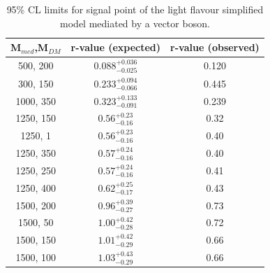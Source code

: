 \begin{table}[h!]
    \caption{%
    95\% CL limits for signal point of the light flavour simplified model 
    mediated by a vector boson. }
    \label{tab:DMV_limits}
    \centering
    \begin{tabular}{ ccc }
        \hline\hline
        M$_{med}$,M$_{DM}$ & r-value (expected) & r-value (observed) \\ 
        \hline
        500, 200  & $0.088_{-0.025}^{+0.036}$ & 0.120 \\
        300, 150  & $0.233_{-0.066}^{+0.094}$ & 0.445 \\
        1000, 350 & $0.323_{-0.091}^{+0.133}$ & 0.239 \\
        1250, 150 & $0.56_{-0.16}^{+0.23}$    & 0.32  \\
        1250, 1   & $0.56_{-0.16}^{+0.23}$    & 0.40  \\
        1250, 350 & $0.57_{-0.16}^{+0.24}$    & 0.40  \\
        1250, 250 & $0.57_{-0.16}^{+0.24}$    & 0.41  \\
        1250, 400 & $0.62_{-0.17}^{+0.25}$    & 0.43  \\
        1500, 200 & $0.96_{-0.27}^{+0.39}$    & 0.73  \\
        1500, 50  & $1.00_{-0.28}^{+0.42}$    & 0.72  \\
        1500, 150 & $1.01_{-0.29}^{+0.42}$    & 0.66  \\
        1500, 100 & $1.03_{-0.29}^{+0.43}$    & 0.66  \\
        \hline\hline
    \end{tabular}
\end{table}

